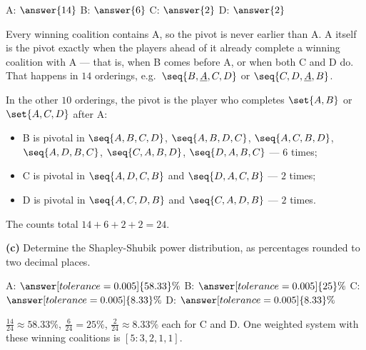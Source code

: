 \documentclass[12pt]{ximera}
\begin{document}
\begin{problem}
\begin{prompt}
A: $\answer{14}$ \quad B: $\answer{6}$ \quad C: $\answer{2}$ \quad D: $\answer{2}$

\begin{feedback}
Every winning coalition contains A, so the pivot is never earlier than A. A itself is
the pivot exactly when the players ahead of it already complete a winning coalition with
A --- that is, when B comes before A, or when both C and D do. That happens in $14$
orderings, e.g.\ $\seq{B,\underline{A},C,D}$ or $\seq{C,D,\underline{A},B}$.

In the other $10$ orderings, the pivot is the player who completes $\set{A,B}$ or
$\set{A,C,D}$ after A:
\begin{itemize}
\item B is pivotal in $\seq{A,B,C,D}$, $\seq{A,B,D,C}$, $\seq{A,C,B,D}$, $\seq{A,D,B,C}$,
      $\seq{C,A,B,D}$, $\seq{D,A,B,C}$ --- $6$ times;
\item C is pivotal in $\seq{A,D,C,B}$ and $\seq{D,A,C,B}$ --- $2$ times;
\item D is pivotal in $\seq{A,C,D,B}$ and $\seq{C,A,D,B}$ --- $2$ times.
\end{itemize}
The counts total $14+6+2+2=24$. \checkmark
\end{feedback}
\end{prompt}

\begin{prompt}
\textbf{(c)} Determine the Shapley-Shubik power distribution, as percentages rounded to
two decimal places.

A: $\answer[tolerance=0.005]{58.33}\%$ \quad B: $\answer[tolerance=0.005]{25}\%$ \quad
C: $\answer[tolerance=0.005]{8.33}\%$ \quad D: $\answer[tolerance=0.005]{8.33}\%$

\begin{feedback}
$\frac{14}{24}\approx 58.33\%$, $\frac{6}{24}=25\%$, $\frac{2}{24}\approx 8.33\%$ each for C
and D. One weighted system with these winning coalitions is $[5:3,2,1,1]$.
\end{feedback}
\end{prompt}
\end{problem}
\end{document}
